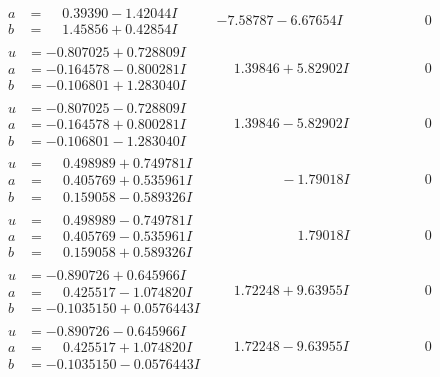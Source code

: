 \documentclass[1p]{elsarticle_modified}
\theoremstyle{definition}
\begin{document}
$$\begin{array}{c|c|c}
\begin{aligned}
a &= \phantom{-}0.39390 - 1.42044 I \\
b &= \phantom{-}1.45856 + 0.42854 I\end{aligned}
 & -7.58787 - 6.67654 I & \phantom{-0.000000 } 0 \\ \hline\begin{aligned}
u &= -0.807025 + 0.728809 I \\
a &= -0.164578 - 0.800281 I \\
b &= -0.106801 + 1.283040 I\end{aligned}
 & \phantom{-}1.39846 + 5.82902 I & \phantom{-0.000000 } 0 \\ \hline\begin{aligned}
u &= -0.807025 - 0.728809 I \\
a &= -0.164578 + 0.800281 I \\
b &= -0.106801 - 1.283040 I\end{aligned}
 & \phantom{-}1.39846 - 5.82902 I & \phantom{-0.000000 } 0 \\ \hline\begin{aligned}
u &= \phantom{-}0.498989 + 0.749781 I \\
a &= \phantom{-}0.405769 + 0.535961 I \\
b &= \phantom{-}0.159058 - 0.589326 I\end{aligned}
 & \phantom{-0.000000 } -1.79018 I & \phantom{-0.000000 } 0 \\ \hline\begin{aligned}
u &= \phantom{-}0.498989 - 0.749781 I \\
a &= \phantom{-}0.405769 - 0.535961 I \\
b &= \phantom{-}0.159058 + 0.589326 I\end{aligned}
 & \phantom{-0.000000 -}1.79018 I & \phantom{-0.000000 } 0 \\ \hline\begin{aligned}
u &= -0.890726 + 0.645966 I \\
a &= \phantom{-}0.425517 - 1.074820 I \\
b &= -0.1035150 + 0.0576443 I\end{aligned}
 & \phantom{-}1.72248 + 9.63955 I & \phantom{-0.000000 } 0 \\ \hline\begin{aligned}
u &= -0.890726 - 0.645966 I \\
a &= \phantom{-}0.425517 + 1.074820 I \\
b &= -0.1035150 - 0.0576443 I\end{aligned}
 & \phantom{-}1.72248 - 9.63955 I & \phantom{-0.000000 } 0 \\ \hline\begin{aligned}

\end{aligned}
\end{array}$$
\end{document}
